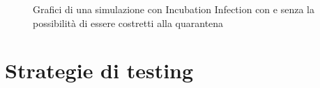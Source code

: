 \documentclass[a4paper,10pt,twocolumn]{article}
\begin{document}
\begin{figure}[p]
    \centering
    \caption{Grafici di una simulazione con Incubation Infection con e senza la possibilità di essere costretti alla quarantena}
\end{figure}

\section{Strategie di testing}
\end{document}
